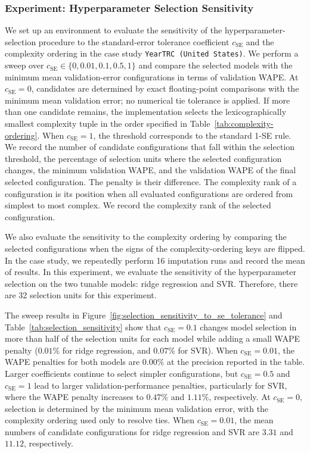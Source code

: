 \subsubsection*{Experiment: Hyperparameter Selection Sensitivity}

We set up an environment to evaluate the sensitivity of the hyperparameter-selection procedure to the standard-error tolerance coefficient \(c_{\mathrm{SE}}\) and the complexity ordering in the case study \texttt{YearTRC (United States)}.
We perform a sweep over \(c_{\mathrm{SE}} \in \{0, 0.01, 0.1, 0.5, 1\}\) and compare the selected models with the minimum mean validation-error configurations in terms of validation WAPE.
At \(c_{\mathrm{SE}} = 0\), candidates are determined by exact floating-point comparisons with the minimum mean validation error; no numerical tie tolerance is applied.
If more than one candidate remains, the implementation selects the lexicographically smallest complexity tuple in the order specified in Table~\ref{tab:complexity-ordering}.
When \(c_{\mathrm{SE}} = 1\), the threshold corresponds to the standard 1-SE rule.
We record the number of candidate configurations that fall within the selection threshold, the percentage of selection units where the selected configuration changes, the minimum validation WAPE, and the validation WAPE of the final selected configuration.
The penalty is their difference.
The complexity rank of a configuration is its position when all evaluated configurations are ordered from simplest to most complex. We record the complexity rank of the selected configuration.

We also evaluate the sensitivity to the complexity ordering by comparing the selected configurations when the signs of the complexity-ordering keys are flipped.
In the case study, we repeatedly perform 16 imputation runs and record the mean of results.
In this experiment, we evaluate the sensitivity of the hyperparameter selection on the two tunable models: ridge regression and SVR. Therefore, there are 32 selection units for this experiment.

The sweep results in Figure~\ref{fig:selection_sensitivity_to_se_tolerance} and Table~\ref{tab:selection_sensitivity} show that \(c_{\mathrm{SE}} = 0.1\) changes model selection in more than half of the selection units for each model while adding a small WAPE penalty (\(0.01\%\) for ridge regression, and \(0.07\%\) for SVR).
When \(c_{\mathrm{SE}} = 0.01\), the WAPE penalties for both models are \(0.00\%\) at the precision reported in the table.
Larger coefficients continue to select simpler configurations, but \(c_{\mathrm{SE}} = 0.5\) and \(c_{\mathrm{SE}} = 1\) lead to larger validation-performance penalties, particularly for SVR, where the WAPE penalty increases to \(0.47\%\) and \(1.11\%\), respectively.
At \(c_{\mathrm{SE}} = 0\), selection is determined by the minimum mean validation error, with the complexity ordering used only to resolve ties.
When \(c_{\mathrm{SE}} = 0.01\), the mean numbers of candidate configurations for ridge regression and SVR are \(3.31\) and \(11.12\), respectively.

